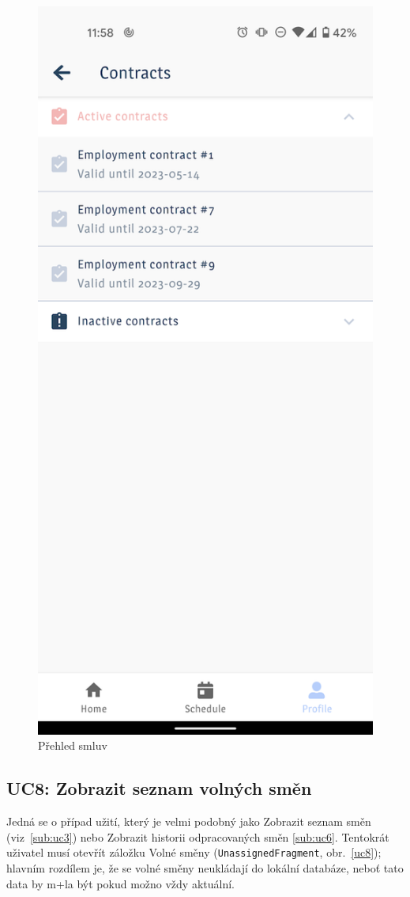 \documentclass[twoside]{ctuthesis}
\begin{document}
\begin{figure}[ht]
	\includegraphics[width=.45\linewidth]{img/uc7.png}
	\caption{Přehled smluv}
	\label{uc7}
\end{figure}
\newpage

\subsection{UC8: Zobrazit seznam volných směn}

Jedná se o případ užití, který je velmi podobný jako Zobrazit seznam směn (viz~\ref{sub:uc3}) nebo Zobrazit historii odpracovaných směn \ref{sub:uc6}. Tentokrát uživatel musí otevřít záložku Volné směny (\texttt{UnassignedFragment}, obr.~\ref{uc8}); hlavním rozdílem je, že se volné směny neukládají do lokální databáze, neboť tato data by m+la být pokud možno vždy aktuální.
\end{document}
